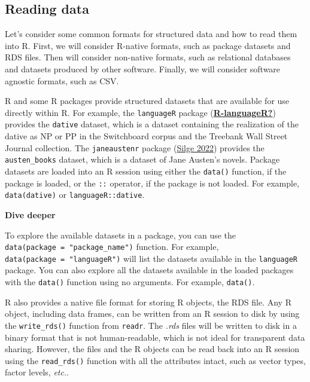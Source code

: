 \documentclass[
  letterpaper,
  DIV=11,
  numbers=noendperiod]{scrreport}
\theoremstyle{definition}
\theoremstyle{remark}
\begin{document}
\hypertarget{reading-data-1}{%
\subsection{Reading data}\label{reading-data-1}}

Let's consider some common formats for structured data and how to read
them into R. First, we will consider R-native formats, such as package
datasets and RDS files. Then will consider non-native formats, such as
relational databases and datasets produced by other software. Finally,
we will consider software agnostic formats, such as CSV.

R and some R packages provide structured datasets that are available for
use directly within R. For example, the \texttt{languageR} package
(\protect\hyperlink{ref-R-languageR}{\textbf{R-languageR?}}) provides
the \texttt{dative} dataset, which is a dataset containing the
realization of the dative as NP or PP in the Switchboard corpus and the
Treebank Wall Street Journal collection. The \texttt{janeaustenr}
package (\protect\hyperlink{ref-R-janeaustenr}{Silge 2022}) provides the
\texttt{austen\_books} dataset, which is a dataset of Jane Austen's
novels. Package datasets are loaded into an R session using either the
\texttt{data()} function, if the package is loaded, or the \texttt{::}
operator, if the package is not loaded. For example,
\texttt{data(dative)} or \texttt{languageR::dative}.

\begin{tcolorbox}[enhanced jigsaw, breakable, colback=white, rightrule=.15mm, arc=.35mm, left=2mm, toprule=.15mm, leftrule=.75mm, bottomrule=.15mm, opacityback=0]

\textbf{ Dive deeper}

To explore the available datasets in a package, you can use the
\texttt{data(package\ =\ "package\_name")} function. For example,
\texttt{data(package\ =\ "languageR")} will list the datasets available
in the \texttt{languageR} package. You can also explore all the datasets
available in the loaded packages with the \texttt{data()} function using
no arguments. For example, \texttt{data()}.

\end{tcolorbox}

R also provides a native file format for storing R objects, the RDS
file. Any R object, including data frames, can be written from an R
session to disk by using the \texttt{write\_rds()} function from
\texttt{readr}. The \emph{.rds} files will be written to disk in a
binary format that is not human-readable, which is not ideal for
transparent data sharing. However, the files and the R objects can be
read back into an R session using the \texttt{read\_rds()} function with
all the attributes intact, such as vector types, factor levels,
\emph{etc.}.
\end{document}
